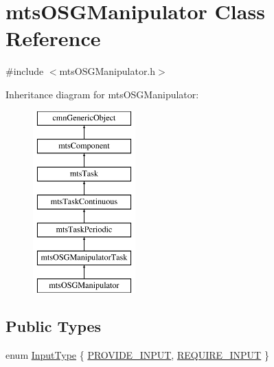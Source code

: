 \hypertarget{classmts_o_s_g_manipulator}{}\section{mts\+O\+S\+G\+Manipulator Class Reference}
\label{classmts_o_s_g_manipulator}


{\ttfamily \#include $<$mts\+O\+S\+G\+Manipulator.\+h$>$}

Inheritance diagram for mts\+O\+S\+G\+Manipulator\+:\begin{figure}[H]
\begin{center}
\leavevmode
\includegraphics[height=7.000000cm]{db/d74/classmts_o_s_g_manipulator}
\end{center}
\end{figure}
\subsection*{Public Types}
\begin{DoxyCompactItemize}
\item 
enum \hyperlink{classmts_o_s_g_manipulator_ac2491ea5f0c735f009c5f8ff91a931b4}{Input\+Type} \{ \hyperlink{classmts_o_s_g_manipulator_ac2491ea5f0c735f009c5f8ff91a931b4a3a5dee79e64f14d03c1ca221e70c40f1}{P\+R\+O\+V\+I\+D\+E\+\_\+\+I\+N\+P\+U\+T}, 
\hyperlink{classmts_o_s_g_manipulator_ac2491ea5f0c735f009c5f8ff91a931b4afc23931d1d2d8d3422b75cecac33291d}{R\+E\+Q\+U\+I\+R\+E\+\_\+\+I\+N\+P\+U\+T}
 \}
\end{DoxyCompactItemize}
